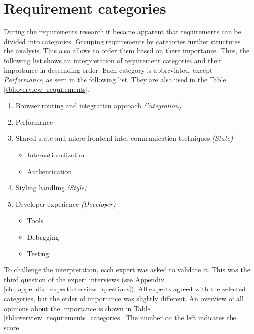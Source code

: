 
\section{Requirement categories}\label{cha:requirement_categories}

During the requirements research it became apparent that requirements can be divided into categories.
Grouping requirements by categories further structures the analysis.
This also allows to order them based on there importance.
Thus, the following list shows an interpretation of requirement categories and their importance in descending order.
Each category is abbreviated, except \textit{Performance}, as seen in the following list.
They are also used in the Table \ref{tbl:overview_requirements}.

\pagebreak

\begin{enumerate}
    \item Browser routing and integration approach \textit{(Integration)}
    \item Performance
    \item Shared state and micro frontend inter-communication techniques \textit{(State)}
          \begin{itemize}
              \item Internationalization
              \item Authentication
          \end{itemize}
    \item Styling handling \textit{(Style)}
    \item Developer experience \textit{(Developer)}
          \begin{itemize}
              \item Tools
              \item Debugging
              \item Testing
          \end{itemize}
\end{enumerate}

To challenge the interpretation, each expert was asked to validate it.
This was the third question of the expert interviews (see Appendix \ref{cha:appendix_expertinterview_questions}).
All experts agreed with the selected categories, but the order of importance was slightly different.
An overview of all opinions about the importance is shown in Table \ref{tbl:overview_requirements_categories}.
The number on the left indicates the score.

